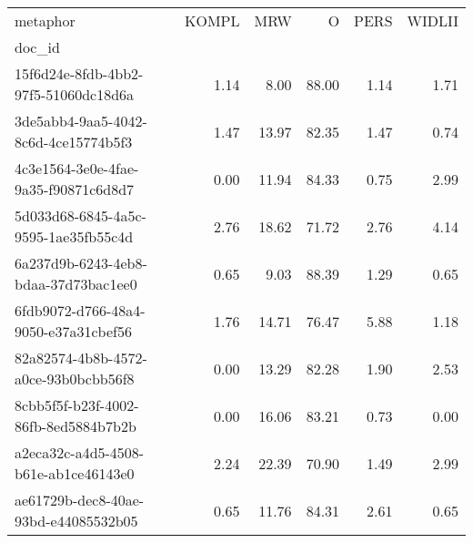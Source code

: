 \begin{tabular}{lrrrrr}
\toprule
metaphor & KOMPL & MRW & O & PERS & WIDLII \\
doc_id &  &  &  &  &  \\
\midrule
15f6d24e-8fdb-4bb2-97f5-51060dc18d6a & 1.14 & 8.00 & 88.00 & 1.14 & 1.71 \\
3de5abb4-9aa5-4042-8c6d-4ce15774b5f3 & 1.47 & 13.97 & 82.35 & 1.47 & 0.74 \\
4c3e1564-3e0e-4fae-9a35-f90871c6d8d7 & 0.00 & 11.94 & 84.33 & 0.75 & 2.99 \\
5d033d68-6845-4a5c-9595-1ae35fb55c4d & 2.76 & 18.62 & 71.72 & 2.76 & 4.14 \\
6a237d9b-6243-4eb8-bdaa-37d73bac1ee0 & 0.65 & 9.03 & 88.39 & 1.29 & 0.65 \\
6fdb9072-d766-48a4-9050-e37a31cbef56 & 1.76 & 14.71 & 76.47 & 5.88 & 1.18 \\
82a82574-4b8b-4572-a0ce-93b0bcbb56f8 & 0.00 & 13.29 & 82.28 & 1.90 & 2.53 \\
8cbb5f5f-b23f-4002-86fb-8ed5884b7b2b & 0.00 & 16.06 & 83.21 & 0.73 & 0.00 \\
a2eca32c-a4d5-4508-b61e-ab1ce46143e0 & 2.24 & 22.39 & 70.90 & 1.49 & 2.99 \\
ae61729b-dec8-40ae-93bd-e44085532b05 & 0.65 & 11.76 & 84.31 & 2.61 & 0.65 \\
\bottomrule
\end{tabular}
